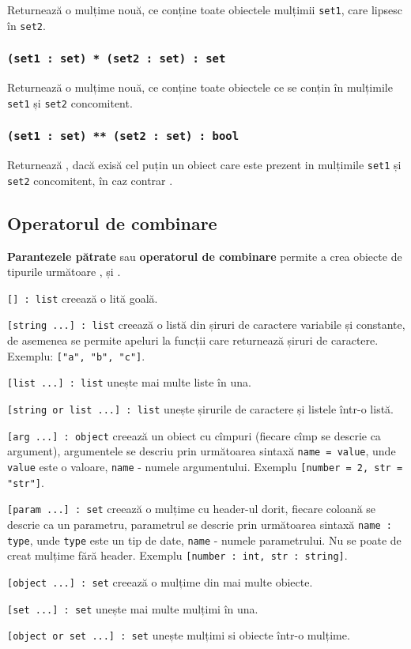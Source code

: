 Returnează o mulțime nouă, ce conține toate obiectele mulțimii \texttt{set1}, care lipsesc în \texttt{set2}.

\subsubsection{\texttt{(set1 : set) * (set2 : set) : set}}

Returnează o mulțime nouă, ce conține toate obiectele ce se conțin în mulțimile \texttt{set1} și \texttt{set2} concomitent.

\subsubsection{\texttt{(set1 : set) ** (set2 : set) : bool}}

Returnează \true, dacă exisă cel puțin un obiect care este prezent in mulțimile \texttt{set1} și \texttt{set2} concomitent, în caz contrar \false.

\subsection{Operatorul de combinare}

{\bf Parantezele pătrate} sau {\bf operatorul de combinare} permite a crea obiecte de tipurile următoare \listtype{}, \set{} și \object{}.

\texttt{[] : list} creează o lită goală.

\texttt{[string ...] : list} creează o listă din șiruri de caractere variabile și constante, de asemenea se permite apeluri la funcții care returnează șiruri de caractere. Exemplu: \texttt{["a", "b", "c"]}.

\texttt{[list ...] : list} unește mai multe liste în una.

\texttt{[string or list ...] : list} unește șirurile de caractere și listele într-o listă.

\texttt{[arg ...] : object} creează un obiect cu cîmpuri (fiecare cîmp se descrie ca argument), argumentele se descriu prin următoarea sintaxă \texttt{name = value}, unde \texttt{value} este o valoare, \texttt{name} - numele argumentului. Exemplu \texttt{[number = 2, str = "str"]}.

\texttt{[param ...] : set} creează o mulțime cu header-ul dorit, fiecare coloană se descrie ca un parametru, parametrul se descrie prin următoarea sintaxă \texttt{name : type}, unde \texttt{type} este un tip de date, \texttt{name} - numele parametrului. Nu se poate de creat mulțime fără header. Exemplu \texttt{[number : int, str : string]}.

\texttt{[object ...] : set} creează o mulțime din mai multe obiecte.

\texttt{[set ...] : set} unește mai multe mulțimi în una.

\texttt{[object or set ...] : set} unește mulțimi si obiecte într-o mulțime.

